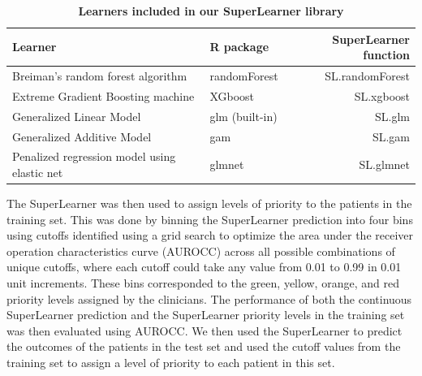 \documentclass[10pt,letterpaper]{article}\usepackage[]{graphicx}\usepackage[]{color}
\begin{document}
\begin{table}[h!]
  \begin{adjustwidth}{-0.25in}{0in}
  \caption{\bf Learners included in our SuperLearner library}
  \label{tab:superlearner-library}
  \begin{tabular}{llr}
    \hline
    Learner                                       & R package                        & SuperLearner function \\
    \hline
    Breiman's random forest algorithm             & randomForest \cite{randomforest} & SL.randomForest \\
    Extreme Gradient Boosting machine             & XGboost \cite{xgboost}           & SL.xgboost \\
    Generalized Linear Model                      & glm (built-in)                   & SL.glm \\
    Generalized Additive Model                    & gam       \cite{gam}             & SL.gam \\
    Penalized regression model using elastic net  & glmnet \cite{glmnet}             & SL.glmnet \\
    \hline
  \end{tabular}
  \end{adjustwidth}
\end{table}

The SuperLearner was then used to assign levels of priority to the patients in
the training set. This was done by binning the SuperLearner prediction into four
bins using cutoffs identified using a grid search to optimize the area under the
receiver operation characteristics curve (AUROCC) across all possible
combinations of unique cutoffs, where each cutoff could take any value from 0.01
to 0.99 in 0.01 unit increments. These bins corresponded to the green, yellow,
orange, and red priority levels assigned by the clinicians. The performance of
both the continuous SuperLearner prediction and the SuperLearner priority levels
in the training set was then evaluated using AUROCC. We then used the
SuperLearner to predict the outcomes of the patients in the test set and used
the cutoff values from the training set to assign a level of priority to each
patient in this set.
\end{document}
